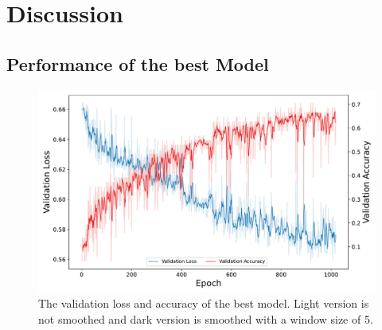 


\section{Discussion}
\label{section4}

\subsection{Performance of the best Model}
\begin{figure}[h!]
    \centering
    \captionsetup{width=.7\linewidth}
    \includegraphics[width=1\textwidth]{figures/loss_acc_best.pdf}
    \caption{
        The validation loss and accuracy of the best model. Light version is not smoothed 
        and dark version is smoothed with a window size of 5.}
    \label{fig:loss_acc_best}
\end{figure}
